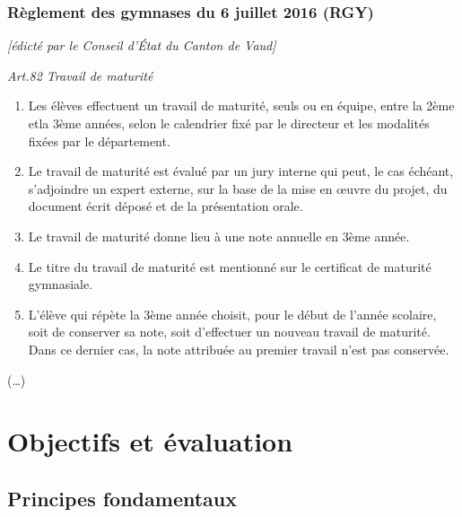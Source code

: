 \documentclass[
  10pt,
  french,
  a5paper,
  openany]{book}
\providecommand{\tightlist}{%
  \setlength{\itemsep}{0pt}\setlength{\parskip}{0pt}}
\begin{document}
\hypertarget{ruxe8glement-des-gymnases-du-6-juillet-2016-rgy}{%
\subsection*{Règlement des gymnases du 6 juillet 2016 (RGY)}\label{ruxe8glement-des-gymnases-du-6-juillet-2016-rgy}}

\emph{{[}édicté par le Conseil d'État du Canton de Vaud{]}}

\emph{Art.82 Travail de maturité}

\begin{enumerate}
\def\labelenumi{\arabic{enumi}.}
\tightlist
\item
  Les élèves effectuent un travail de maturité, seuls ou en équipe, entre la 2ème etla 3ème années, selon le calendrier fixé par le directeur et les modalités fixées par le département.
\item
  Le travail de maturité est évalué par un jury interne qui peut, le cas échéant, s'adjoindre un expert externe, sur la base de la mise en œuvre du projet, du document écrit déposé et de la présentation orale.
\item
  Le travail de maturité donne lieu à une note annuelle en 3ème année.
\item
  Le titre du travail de maturité est mentionné sur le certificat de maturité gymnasiale.
\item
  L'élève qui répète la 3ème année choisit, pour le début de l'année scolaire, soit de conserver sa note, soit d'effectuer un nouveau travail de maturité. Dans ce dernier cas, la note attribuée au premier travail n'est pas conservée.
\end{enumerate}

(\ldots)

\hypertarget{objectifs-et-uxe9valuation}{%
\chapter*{Objectifs et évaluation}\label{objectifs-et-uxe9valuation}}

\hypertarget{principes-fondamentaux}{%
\section*{Principes fondamentaux}\label{principes-fondamentaux}}
\end{document}
